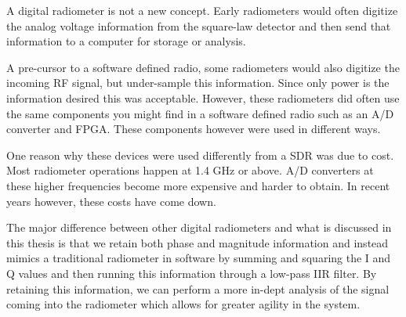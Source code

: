A digital radiometer is not a new concept.  Early radiometers would often digitize the analog voltage information from the square-law detector and then send that information to a computer for storage or analysis.  

A pre-cursor to a software defined radio, some radiometers would also digitize the incoming RF signal, but under-sample this information.  Since only power is the information desired this was acceptable.  However, these radiometers did often use the same components you might find in a software defined radio such as an A/D converter and FPGA.  These components however were used in different ways.

One reason why these devices were used differently from a SDR was due to cost.  Most radiometer operations happen at 1.4 GHz or above.  A/D converters at these higher frequencies become more expensive and harder to obtain.  In recent years however, these costs have come down.

The major difference between other digital radiometers and what is discussed in this thesis is that we retain both phase and magnitude information and instead mimics a traditional radiometer in software by summing and squaring the I and Q values and then running this information through a low-pass IIR filter.  By retaining this information, we can perform a more in-dept analysis of the signal coming into the radiometer which allows for greater agility in the system.